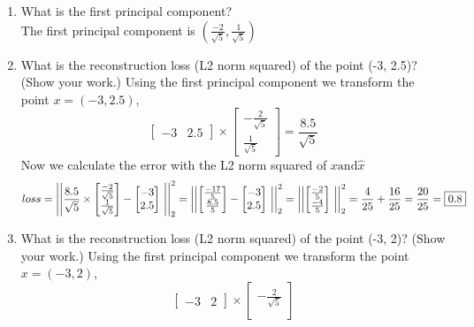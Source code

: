 \documentclass{article}
\def\blu#1{{\color{blu}#1}}
\def\ans#1{{\color{ans}#1}}
\def\enum#1{\begin{enumerate}#1\end{enumerate}}
\begin{document}
\blu{
\enum{
\item What is the first principal component? \\
\ans{
    The first principal component is $(\frac{-2}{\sqrt{5}}, \frac{1}{\sqrt{5}})$
}
\item What is the reconstruction loss (L2 norm squared) of the point (-3, 2.5)? (Show your work.)
\ans{
    Using the first principal component we transform the point $x = (-3, 2.5)$,
    \[ 
        \begin{bmatrix} 
            -3 & 2.5
        \end{bmatrix}
        \times  
        \begin{bmatrix} 
            -\frac{2}{\sqrt{5}} \\
            \frac{1}{\sqrt{5}}
        \end{bmatrix}     
        = \frac{8.5}{\sqrt{5}}
    \]
    Now we calculate the error with the L2 norm squared of $x \text{and} \hat{x}$
    \[ 
        loss = \left|\left| \frac{8.5}{\sqrt{5}} \times \begin{bmatrix} \frac{-2}{\sqrt{5}} \\ \frac{1}{\sqrt{5}} \end{bmatrix} - \begin{bmatrix} -3 \\ 2.5 \end{bmatrix} \right|\right|_2^2 = 
        \left|\left| \begin{bmatrix} \frac{-17}{5} \\ \frac{8.5}{5} \end{bmatrix} - \begin{bmatrix} -3 \\ 2.5 \end{bmatrix} \right|\right|_2^2 = 
        \left|\left| \begin{bmatrix} \frac{-2}{5} \\ \frac{-4}{5}\end{bmatrix} \right|\right|_2^2 = 
        \frac{4}{25} + \frac{16}{25} = \frac{20}{25} = \fbox{0.8}
    \]
}
\item What is the reconstruction loss (L2 norm squared) of the point (-3, 2)? (Show your work.)
\ans{
    Using the first principal component we transform the point $x = (-3, 2)$,
    \[ 
        \begin{bmatrix} 
            -3 & 2
        \end{bmatrix}
        \times  
        \begin{bmatrix} 
            -\frac{2}{\sqrt{5}} \\

\end{bmatrix}\]}}}
\end{document}
